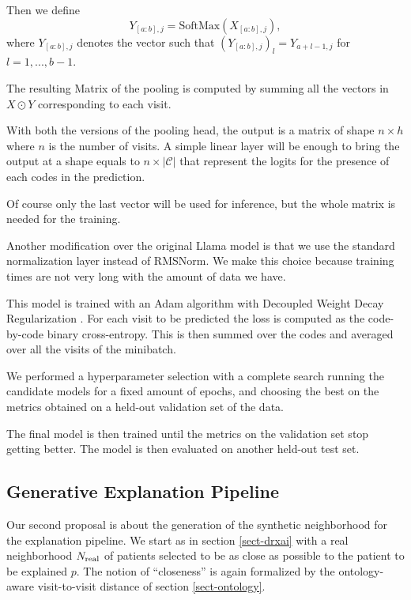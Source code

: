 \documentclass[]{marticle}
\newcommand{\codes}{\mathcal{C}}
\begin{document}
Then we define
\begin{equation*}
   Y_{[a:b], j} = \text{SoftMax}(X_{[a:b], j}),
\end{equation*}
where $Y_{[a:b], j}$ denotes the vector such that $(Y_{[a:b], j})_l = Y_{a+l-1, j}$ for ${{l=1,..., b-1}}$.

The resulting Matrix of the pooling is computed by summing all the vectors in $X\odot Y$
corresponding to each visit.

With both the versions of the pooling head, the output is a matrix of shape $n \times h$ where $n$
is the number of visits. A simple linear layer will be enough to bring the output at a shape equals
to $n \times |\codes|$ that represent the logits for the presence of each codes in the prediction.

Of course only the last vector will be used for inference, but the whole matrix is needed for the
training.

Another modification over the original Llama model is that we use the standard normalization layer
instead of RMSNorm. We make this choice because training times are not very long with the amount of
data we have.

This model is trained with an Adam algorithm with Decoupled Weight Decay Regularization
\cite{paper-adamw}. For each visit to be predicted the loss is computed as the code-by-code binary
cross-entropy. This is then summed over the codes and averaged over all the visits of the minibatch.

We performed a hyperparameter selection with a complete search running the candidate models for a
fixed amount of epochs, and choosing the best on the metrics obtained on a held-out validation set
of the data.

The final model is then trained until the metrics on the validation set stop getting better. The
model is then evaluated on another held-out test set.

\subsection{Generative Explanation Pipeline}

Our second proposal is about the generation of the synthetic neighborhood for the explanation
pipeline. We start as in section \ref{sect-drxai} with a real neighborhood $N_\text{real}$ of patients
selected to be as close as possible to the patient to be explained $p$. The notion of ``closeness''
is again formalized by the ontology-aware visit-to-visit distance of section \ref{sect-ontology}.
\end{document}
